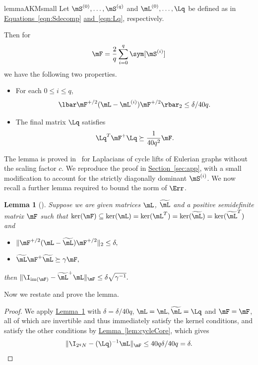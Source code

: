\documentclass[11pt]{article}
\newcommand{\expref}[2]{\texorpdfstring{\hyperref[#2]{#1~\ref{#2}}}{#1~\ref{#2}}}
\newcommand{\expeqref}[2]{\texorpdfstring{\hyperref[#2]{#1~\eqref{#2}}}{#1~\eqref{#2}}}
\newtheorem{lemma}[theorem]{Lemma}
\begin{document}
%
\begin{restatable}{lemma}{AKMsmall}
\label{lem:cycleCore}
  Let $\mS^{(0)},\dots,\mS^{(q)}$ and $\mL^{(0)},\dots,\Lq$ be defined as in 
\expeqref{Equations}{eqn:Sdecomp} \expeqref{and}{eqn:Lq}, respectively. %
%

Then for 
$$\mF = \frac{2}{q}\sum_{i=0}^q\sym[\mS^{(i)}]$$
we have the following %
two properties. %
\begin{itemize}
    \item For each $0\leq i \leq q$,
    $$\lbar \mF^{+/2}(\mL-\mL^{(i)})\mF^{+/2}\rbar_2 \leq \delta/40q .$$ %
    
    \item The final matrix $\Lq$ satisfies 
    $${\Lq}^T \mF^{+}\Lq \succeq \frac{1}{40q^2}\mF.$$
\end{itemize}
\end{restatable}
The lemma is proved in~\cite{AhmadinejadKeMuPeSiVa19} for Laplacians of cycle lifts of Eulerian graphs without the scaling factor $c$. We reproduce the proof in \expref{Section}{sec:app}, with a small modification to account for the strictly diagonally dominant
%
$\mS^{(i)}$.  %
We now recall a further lemma required to bound the norm of $\Err$.
%
\begin{lemma}[{\cite[Lemma D.4]{AhmadinejadKeMuPeSiVa19}}]\label{lem:D4}  %
Suppose we are given matrices $\mL$, $\widetilde{\mL}$ and a positive
%
semidefinite  %
matrix $\mF$ such that $\ker(\mF) \subseteq \ker(\mL) = \ker(\mL^T) = \ker(\widetilde{\mL}) = \ker(\widetilde{\mL}^T)$ and
\begin{itemize}
    \item $\|\mF^{+/2}(\mL-\widetilde{\mL})\mF^{+/2}\|_2\leq \delta,$
    \item $\widetilde{\mL}\mF^+\widetilde{\mL}\succeq \gamma \mF,$
\end{itemize}
then $\|\I_{\text{im}(\mF)}-\widetilde{\mL}^+\mL\|_\mF \leq \delta \sqrt{\gamma^{-1}}.$
\end{lemma}
%
Now we restate and prove the lemma.  %
\goodF*
\begin{proof}
  We apply \expref{Lemma}{lem:D4} with $\delta=\delta/40q$, $\mL=\mL,\widetilde{\mL}=\Lq$ and $\mF=\mF$, all of which are invertible and thus immediately satisfy the kernel
%
conditions, %
and satisfy the other %
conditions  %
by \expref{Lemma}{lem:cycleCore}, which gives
\[\|\I_{2^qN}-(\Lq)^{-1}\mL\|_\mF\leq 40q\delta/40q= \delta. \]
\end{proof}
\end{document}
